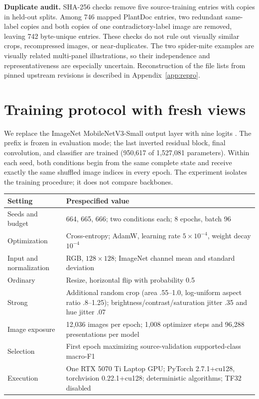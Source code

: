 \documentclass[11pt,letterpaper]{article}
\begin{document}
\textbf{Duplicate audit.} SHA-256 checks remove five source-training entries with copies in held-out splits. Among 746 mapped PlantDoc entries, two redundant same-label copies and both copies of one contradictory-label image are removed, leaving 742 byte-unique entries. These checks do not rule out visually similar crops, recompressed images, or near-duplicates. The two spider-mite examples are visually related multi-panel illustrations, so their independence and representativeness are especially uncertain. Reconstruction of the file lists from pinned upstream revisions is described in Appendix~\ref{app:repro}.

\section{Training protocol with fresh views}
We replace the ImageNet MobileNetV3-Small output layer with nine logits \cite{mobile}. The prefix is frozen in evaluation mode; the last inverted residual block, final convolution, and classifier are trained (950,617 of 1,527,081 parameters). Within each seed, both conditions begin from the same complete state and receive exactly the same shuffled image indices in every epoch. The experiment isolates the training procedure; it does not compare backbones.

\begin{center}\small
\begin{tabular}{p{.27\linewidth}p{.65\linewidth}}\toprule
Setting & Prespecified value\\\midrule
Seeds and budget & 664, 665, 666; two conditions each; 8 epochs, batch 96\\
Optimization & Cross-entropy; AdamW, learning rate $5\times10^{-4}$, weight decay $10^{-4}$\\
Input and normalization & RGB, $128\times128$; ImageNet channel mean and standard deviation\\
Ordinary & Resize, horizontal flip with probability 0.5\\
Strong & Additional random crop (area .55--1.0, log-uniform aspect ratio .8--1.25); brightness/contrast/saturation jitter .35 and hue jitter .07\\
Image exposure & 12,036 images per epoch; 1,008 optimizer steps and 96,288 presentations per model\\
Selection & First epoch maximizing source-validation supported-class macro-F1\\
Execution & One RTX 5070 Ti Laptop GPU; PyTorch 2.7.1+cu128, torchvision 0.22.1+cu128; deterministic algorithms; TF32 disabled\\\bottomrule
\end{tabular}
\end{center}
\end{document}

